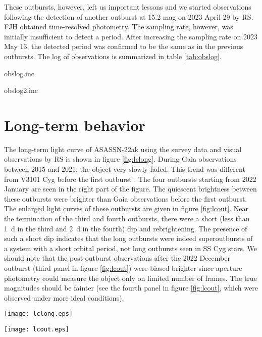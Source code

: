 \documentclass{article}
\def\xxinput#1{#1}
\begin{document}
   These outbursts, however, left us important lessons
and we started observations following the detection of
another outburst at 15.2 mag on 2023 April 29 by RS.
FJH obtained time-resolved photometry.  The sampling rate,
however, was initially insufficient to detect a period.
After increasing the sampling rate on 2023 May 13,
the detected period was confirmed to be the same as in
the previous outbursts.
The log of observations is summarized in table \ref{tab:obslog}.

\xxinput{obslog.inc}
\addtocounter{table}{-1}
\xxinput{obslog2.inc}

\section{Long-term behavior}

   The long-term light curve of ASASSN-22ak using the survey
data and visual observations by RS is shown in
figure \ref{fig:lclong}.  During Gaia observations between
2015 and 2021, the object very slowly faded.  This trend
was different from V3101 Cyg before the first outburst
\citep{tam20v3101cyg}.
The four outbursts starting from 2022 January are seen
in the right part of the figure.  The quiescent brightness
between these outbursts were brighter than Gaia observations
before the first outburst.  The enlarged light curves of
these outbursts are given in figure \ref{fig:lcout}.
Near the termination of the third and fourth outbursts,
there were a short (less than 1~d in the third and 2~d
in the fourth) dip and rebrightening.  The presence of such
a short dip indicates that the long outbursts were indeed
superoutbursts of a system with a short orbital period,
not long outbursts seen in SS Cyg stars.
We should note that the post-outburst observations after
the 2022 December outburst (third panel in figure \ref{fig:lcout})
were biased brighter since aperture photometry could
measure the object only on limited number of frames.
The true magnitudes should be fainter (see the fourth panel
in figure \ref{fig:lcout}, which were observed under more
ideal conditions).

\begin{figure*}
\begin{center}
\texttt{[image: lclong.eps]}
\caption{
   Long-term light curve of ASASSN-22ak.
}
\label{fig:lclong}
\end{center}
\end{figure*}

\begin{figure*}
\begin{center}
\texttt{[image: lcout.eps]}
\caption{
   Light curves the outbursts of ASASSN-22ak.  The peaks of
   the outbursts are not aligned to show the existing data
   between the outbursts better.  The symbols are the same as in
   figure \ref{fig:lclong}.  The small dots represent nightly
   averaged unfiltered CCD magnitudes by FJH.
   Near the termination of the third and fourth outbursts,
   there were a short (0.5--2~d) dip and rebrightening.
   ASAS-SN did not detect the object 1-d before the initial
   detection (upper limit 17.0 mag).
}
\label{fig:lcout}
\end{center}
\end{figure*}
\end{document}
